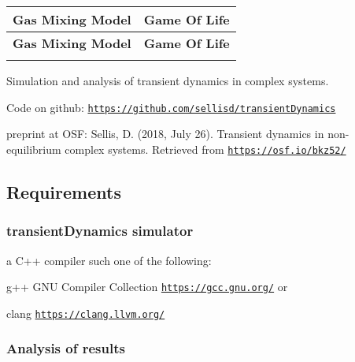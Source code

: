 \begin{center}\end{center} 

\begin{center}\tabulinesep=1mm
\begin{longtabu} spread 0pt [c]{*{2}{|X[-1]}|}
\hline
\rowcolor{\tableheadbgcolor}\textbf{ Gas Mixing Model }&\textbf{ Game Of Life  }\\
\endfirsthead
\hline
\endfoot
\hline
\rowcolor{\tableheadbgcolor}\textbf{ Gas Mixing Model }&\textbf{ Game Of Life  }\\
\endhead
 & \\
\end{longtabu}
\end{center} 





Simulation and analysis of transient dynamics in complex systems.

Code on github\+: \href{https://github.com/sellisd/transientDynamics}{\tt https\+://github.\+com/sellisd/transient\+Dynamics}

preprint at O\+SF\+: Sellis, D. (2018, July 26). Transient dynamics in non-\/equilibrium complex systems. Retrieved from \href{https://osf.io/bkz52/}{\tt https\+://osf.\+io/bkz52/}

\subsection*{Requirements}

\subsubsection*{transient\+Dynamics simulator}


\begin{DoxyItemize}
\item a C++ compiler such one of the following\+:
\begin{DoxyItemize}
\item g++ G\+NU Compiler Collection \href{https://gcc.gnu.org/}{\tt https\+://gcc.\+gnu.\+org/} or
\item clang \href{https://clang.llvm.org/}{\tt https\+://clang.\+llvm.\+org/}
\end{DoxyItemize}
\end{DoxyItemize}

\subsubsection*{Analysis of results}


